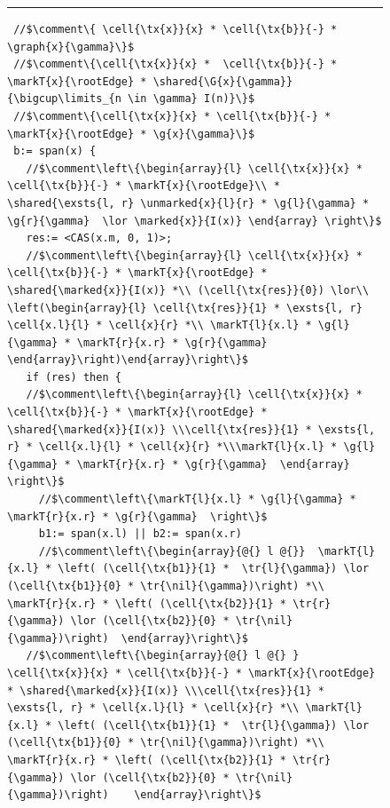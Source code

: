 \begin{figure}
\hrule
\begin{lstlisting}
 //$\comment\{ \cell{\tx{x}}{x} * \cell{\tx{b}}{-} * \graph{x}{\gamma}\}$
 //$\comment\{\cell{\tx{x}}{x} *  \cell{\tx{b}}{-} * \markT{x}{\rootEdge} * \shared{\G{x}{\gamma}}{\bigcup\limits_{n \in \gamma} I(n)}\}$
 //$\comment\{\cell{\tx{x}}{x} * \cell{\tx{b}}{-} * \markT{x}{\rootEdge} * \g{x}{\gamma}\}$
 b:= span(x) {
   //$\comment\left\{\begin{array}{l} \cell{\tx{x}}{x} * \cell{\tx{b}}{-} * \markT{x}{\rootEdge}\\ * \shared{\exsts{l, r} \unmarked{x}{l}{r} * \g{l}{\gamma} * \g{r}{\gamma}  \lor \marked{x}}{I(x)} \end{array} \right\}$
   res:= <CAS(x.m, 0, 1)>;
   //$\comment\left\{\begin{array}{l} \cell{\tx{x}}{x} * \cell{\tx{b}}{-} * \markT{x}{\rootEdge} * \shared{\marked{x}}{I(x)} *\\ (\cell{\tx{res}}{0}) \lor\\  \left(\begin{array}{l} \cell{\tx{res}}{1} * \exsts{l, r} \cell{x.l}{l} * \cell{x}{r} *\\ \markT{l}{x.l} * \g{l}{\gamma} * \markT{r}{x.r} * \g{r}{\gamma} \end{array}\right)\end{array}\right\}$
   if (res) then { 
   //$\comment\left\{\begin{array}{l} \cell{\tx{x}}{x} * \cell{\tx{b}}{-} * \markT{x}{\rootEdge} * \shared{\marked{x}}{I(x)} \\\cell{\tx{res}}{1} * \exsts{l, r} * \cell{x.l}{l} * \cell{x}{r} *\\\markT{l}{x.l} * \g{l}{\gamma} * \markT{r}{x.r} * \g{r}{\gamma}  \end{array} \right\}$
     //$\comment\left\{\markT{l}{x.l} * \g{l}{\gamma} * \markT{r}{x.r} * \g{r}{\gamma}  \right\}$   
     b1:= span(x.l) || b2:= span(x.r)
     //$\comment\left\{\begin{array}{@{} l @{}}  \markT{l}{x.l} * \left( (\cell{\tx{b1}}{1} *  \tr{l}{\gamma}) \lor (\cell{\tx{b1}}{0} * \tr{\nil}{\gamma})\right) *\\ \markT{r}{x.r} * \left( (\cell{\tx{b2}}{1} * \tr{r}{\gamma}) \lor (\cell{\tx{b2}}{0} * \tr{\nil}{\gamma})\right)  \end{array}\right\}$   
   //$\comment\left\{\begin{array}{@{} l @{} }  \cell{\tx{x}}{x} * \cell{\tx{b}}{-} * \markT{x}{\rootEdge} * \shared{\marked{x}}{I(x)} \\\cell{\tx{res}}{1} * \exsts{l, r} * \cell{x.l}{l} * \cell{x}{r} *\\ \markT{l}{x.l} * \left( (\cell{\tx{b1}}{1} *  \tr{l}{\gamma}) \lor (\cell{\tx{b1}}{0} * \tr{\nil}{\gamma})\right) *\\ \markT{r}{x.r} * \left( (\cell{\tx{b2}}{1} * \tr{r}{\gamma}) \lor (\cell{\tx{b2}}{0} * \tr{\nil}{\gamma})\right)    \end{array}\right\}$  

\end{lstlisting}
\end{figure}
